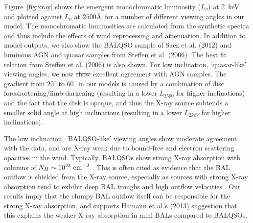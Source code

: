 \documentclass[preprint, a4paper, 11pt]{aastex}
\providecommand{\DIFadd}[1]{{\protect\color{blue}\uwave{#1}}} %
\providecommand{\DIFdel}[1]{{\protect\color{red}\sout{#1}}}                      %
\providecommand{\DIFaddbegin}{} %
\providecommand{\DIFaddend}{} %
\providecommand{\DIFdelbegin}{} %
\providecommand{\DIFdelend}{} %
\begin{document}
\DIFaddend Figure~\ref{fig:xray} shows the emergent
monochromatic luminosity ($L_\nu$) at 2~keV and 
plotted against $L_\nu$ at $2500$\AA\ for a number of different viewing angles in our model.
The monochromatic luminosities are calculated from the synthetic spectra and thus include
the effects of wind reprocessing and attenuation. In addition to model outputs,
we also show the BALQSO sample of Saez et al. (2012) and luminous AGN and quasar
samples from Steffen et al. (2006). The best fit relation from Steffen et al. (2006) 
is also shown. For low inclination, `quasar-like' viewing angles,
we now \DIFdelbegin \DIFdel{show }\DIFdelend \DIFaddbegin \DIFadd{find }\DIFaddend excellent agreement with AGN samples. The gradient from $20^\circ$ to
$60^\circ$ in our models is caused by a combination of disc foreshortening/limb-darkening 
(resulting in a lower $L_{2500}$ for higher inclinations) and the fact that the disk 
is opaque, and thus the X-ray source subtends a smaller solid angle at high inclinations
(resulting in a lower $L_{2keV}$ for higher inclinations). 



The low inclination, `BALQSO-like' viewing angles show moderate agreement with the data,
and are X-ray weak due to bound-free and electron scattering opacities in the wind.
Typically, BALQSOs show strong X-ray absorption with columns 
of $N_H\sim10^{23}~\rm{cm^{-2}}$ 
\citep{green1996,mathur2000,green2001,grupemathur2003}.
This is often cited as evidence that the BAL outflow is shielded from
the X-ray source, especially as sources with strong X-ray absorption tend
to exhibit deep BAL troughs and high outflow velocities 
\citep{brandt2000,laorbrandt2002,gallagher2006}.
Our results imply that the clumpy BAL outflow
itself can be responsible for the strong X-ray absorption, 
and supports Hamann et al.'s (2013) suggestion that 
this explains the weaker X-ray absorption in mini-BALs 
compared to BALQSOs.
\end{document}
